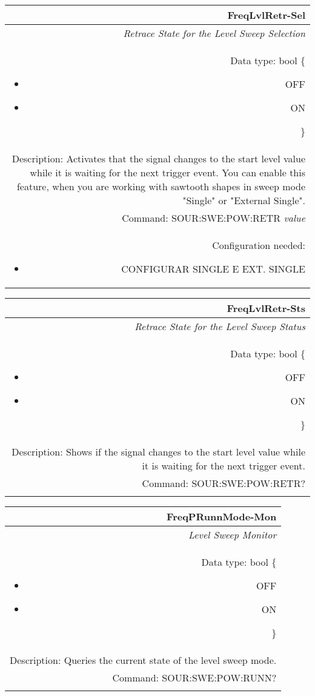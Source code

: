 \documentclass[openany]{article}
\begin{document}
		\begin{tabular}{N}
			\hline
			\bfseries FreqLvlRetr-Sel \\ \hline
			\emph{Retrace State for the Level Sweep Selection} \\
			Data type: bool \{\begin{itemize}[noitemsep]
				\small
				\item[] OFF
				\item[] ON
			\end{itemize}\} \\
			Description: Activates that the signal changes to the start level value while it is waiting for the next trigger event. You can enable this feature, when you are working with sawtooth shapes in sweep mode "Single" or "External Single". \\
			Command: SOUR:SWE:POW:RETR \emph{value} \\
			Configuration needed:\begin{itemize}[noitemsep]
				\small
				\item[] CONFIGURAR SINGLE E EXT. SINGLE
			\end{itemize} \\

		\end{tabular}


		\begin{tabular}{N}
			\hline
			\bfseries FreqLvlRetr-Sts \\ \hline
			\emph{Retrace State for the Level Sweep Status} \\
			Data type: bool \{\begin{itemize}[noitemsep]
				\small
				\item[] OFF
				\item[] ON
			\end{itemize}\} \\
			Description: Shows if the signal changes to the start level value while it is waiting for the next trigger event. \\
			Command: SOUR:SWE:POW:RETR? \\
			\\
			
		\end{tabular}


		\begin{tabular}{N}
			\hline
			\bfseries FreqPRunnMode-Mon \\ \hline
			\emph{Level Sweep Monitor} \\
			Data type: bool \{\begin{itemize}[noitemsep]
				\small
				\item[] OFF
				\item[] ON
			\end{itemize}\} \\
			Description: Queries the current state of the level sweep mode. \\
			Command: SOUR:SWE:POW:RUNN? \\
			\\
			
		\end{tabular}
\end{document}
